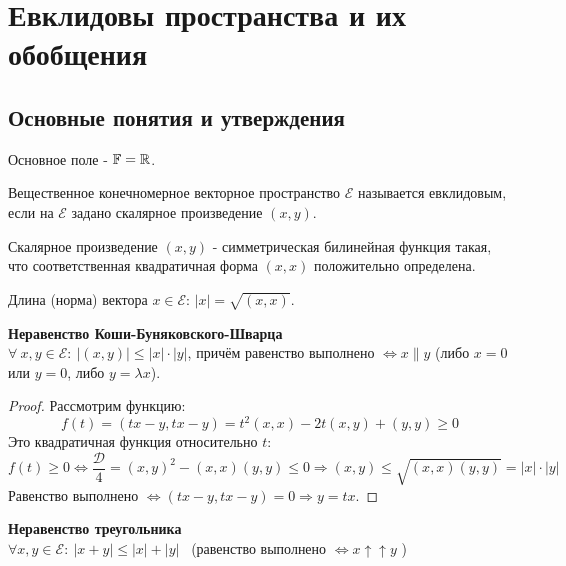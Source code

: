 \section{Евклидовы пространства и их обобщения}
\subsection{Основные понятия и утверждения}
Основное поле - $\mathbb{F} = \mathbb{R}$.
\begin{definition}
    Вещественное конечномерное векторное пространство $\mathcal{E}$ называется евклидовым, если на $\mathcal{E}$ задано скалярное произведение $(x,y)$.
\end{definition}
\begin{definition}
    Скалярное произведение $(x,y)$ - симметрическая билинейная функция такая, что соответственная квадратичная форма $(x,x)$ положительно определена.
\end{definition} 
\begin{definition}
    Длина (норма) вектора $x\in\mathcal{E}$: $|x| = \sqrt{(x,x)}$.
\end{definition}
\begin{theorem} \textbf{Неравенство Коши-Буняковского-Шварца}\\
    $\forall \ x,y\in\mathcal{E}: \ |(x,y)|\leqslant|x|\cdot|y|$, причём равенство выполнено $\Longleftrightarrow  x \parallel y$ (либо $x = 0$ или $y = 0$, либо $y = \lambda x$).
\end{theorem}
\begin{proof}
    Рассмотрим функцию: 
    $$f(t) = (tx-y, tx-y) = t^2(x,x) -2t(x,y) + (y,y) \geqslant 0$$
    Это квадратичная функция относительно $t$:
    $$f(t)\geqslant 0 \Longleftrightarrow  \frac{\mathcal{D}}{4} = (x,y)^2 - (x,x)(y,y) \leqslant 0 \Longrightarrow  (x,y) \leq \sqrt{(x,x)(y,y)} = |x|\cdot|y|$$
    Равенство выполнено $\Longleftrightarrow  (tx-y, tx-y) = 0 \Longrightarrow  y = tx$.
\end{proof}
\begin{theorem} \textbf{Неравенство треугольника}\\
    $\forall x, y \in \mathcal{E} : \ |x+y| \leq |x| + |y|$ \ (равенство выполнено $\Longleftrightarrow x \uparrow \uparrow y$ ) 
\end{theorem}
